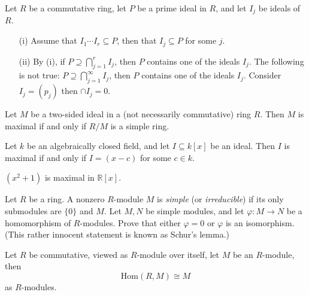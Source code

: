 \documentclass[openany]{book}
\begin{document}
\begin{prop}[4.19]
    Let \( R \) be a commutative ring, let \( P \) be a prime ideal in \( R \), and let \( I_j \) be ideals of \( R \).
    \begin{itemize}
        \item[(i)] Assume that \( I_1 \cdots I_r \subseteq P \), then that \( I_j \subseteq P \) for some \( j \).
        \item[(ii)] By (i), if \( P \supseteq \bigcap_{j=1}^r I_j \), then \( P \) contains one of the ideals \( I_j \). The following is not true: \( P \supseteq \bigcap_{j=1}^\infty I_j \), then \( P \) contains one of the ideals \( I_j \). Consider $I_j=(p_j)$ then $\cap I_j=0$.
    \end{itemize}
\end{prop}


\begin{prop}[4.20]
    Let \( M \) be a two-sided ideal in a (not necessarily commutative) ring \( R \). Then \( M \) is maximal if and only if \( R/M \) is a simple ring.
\end{prop}

\begin{prop}[4.21]
    Let \( k \) be an algebraically closed field, and let \( I \subseteq k[x] \) be an ideal. Then \( I \) is maximal if and only if \( I = (x - c) \) for some \( c \in k \).
\end{prop}


\begin{prop}[4.22]
    \( (x^2 + 1) \) is maximal in \( \mathbb{R}[x] \).
\end{prop}


\begin{prop}[5.4]
    Let \( R \) be a ring. A nonzero \( R \)-module \( M \) is \textit{simple} (or \textit{irreducible}) if its only submodules are \(\{0\}\) and \( M \). Let \( M, N \) be simple modules, and let \(\varphi : M \to N\) be a homomorphism of \( R \)-modules. Prove that either \(\varphi = 0\) or \(\varphi\) is an isomorphism. (This rather innocent statement is known as Schur's lemma.)
\end{prop}


\begin{prop}[5.5]
    Let $R$ be commutative, viewed as $R$-module over itself, let $M$ be an $R$-module, then 
    \begin{equation*}
        \text{Hom}(R,M)\cong M
    \end{equation*}
    as $R$-modules.
\end{prop}
\end{document}
